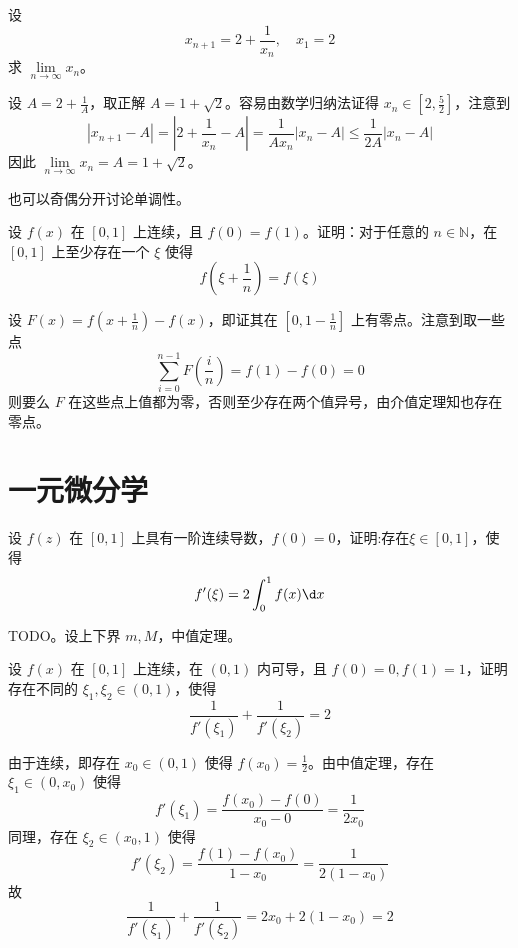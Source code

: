 \begin{problem}[000030]
设
\[ x_{n+1} = 2 + \frac{1}{x_n}, \quad x_1 = 2 \]
求 $\lim\limits_{n \to \infty} x_n$。
\end{problem}

\begin{solution}
	设 $A = 2 + \frac{1}{A}$，取正解 $A = 1 + \sqrt{2}$。容易由数学归纳法证得 $x_n \in [2, \frac{5}{2}]$，注意到
	\[ |x_{n+1} - A| = \left|2 + \frac{1}{x_n} - A\right| = \frac{1}{Ax_n} |x_n - A| \leqslant \frac{1}{2A} |x_n - A| \]
	因此 $\lim\limits_{n \to \infty} x_n = A = 1 + \sqrt{2}$。

	也可以奇偶分开讨论单调性。
\end{solution}

\begin{problem}[000031]
设 $f(x)$ 在 $[0, 1]$ 上连续，且 $f(0) = f(1)$。证明：对于任意的 $n \in \mathbb{N}$，在 $[0, 1]$ 上至少存在一个 $\xi$ 使得
\[ f\left(\xi + \frac{1}{n}\right) = f(\xi) \]
\end{problem}

\begin{solution}
	设 $F(x) = f(x + \frac{1}{n}) - f(x)$，即证其在 $[0, 1 - \frac{1}{n}]$ 上有零点。注意到取一些点
	\[ \sum_{i=0}^{n - 1} F \left(\frac{i}{n}\right) = f(1) - f(0) = 0 \]
	则要么 $F$ 在这些点上值都为零，否则至少存在两个值异号，由介值定理知也存在零点。
\end{solution}

\section{一元微分学}

\begin{problem}[000009]
设 $f(z)$ 在 $[0,1]$ 上具有一阶连续导数，$f(0) = 0$，证明:存在$\xi \in [0,1]$，使得
\[ f'(\xi) = 2\int_0^1f(x) \d x \]
\end{problem}

\begin{solution}
	TODO。设上下界 $m, M$，中值定理。
\end{solution}

\begin{problem}[000010]
设 $f(x)$ 在 $[0, 1]$ 上连续，在 $(0, 1)$ 内可导，且 $f(0) = 0, f(1) = 1$，证明存在不同的 $\xi_1, \xi_2 \in (0, 1)$，使得
\[ \frac{1}{f'(\xi_1)} + \frac{1}{f'(\xi_2)} = 2 \]
\end{problem}

\begin{solution}
	由于连续，即存在 $x_0 \in (0, 1)$ 使得 $f(x_0) = \frac{1}{2}$。由中值定理，存在 $\xi_1 \in (0, x_0)$ 使得
	\[ f'(\xi_1) = \frac{f(x_0) - f(0)}{x_0 - 0} = \frac{1}{2x_0}
	\]
	同理，存在 $\xi_2 \in (x_0, 1)$ 使得
	\[ f'(\xi_2) = \frac{f(1) - f(x_0)}{1 - x_0} = \frac{1}{2(1 -x_0)} \]
	故
	\[ \frac{1}{f'(\xi_1)} + \frac{1}{f'(\xi_2)} = 2x_0 + 2(1 - x_0) = 2 \]

\end{solution}

